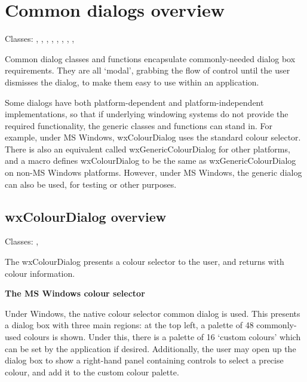 \section{Common dialogs overview}\label{commondialogsoverview}

Classes: , ,
\rtfsp{}, ,\rtfsp
{}, ,\rtfsp
{}, ,\rtfsp
{}

Common dialog classes and functions encapsulate commonly-needed dialog box requirements.
They are all `modal', grabbing the flow of control until the user dismisses the dialog,
to make them easy to use within an application.

Some dialogs have both platform-dependent and platform-independent implementations,
so that if underlying windowing systems do not provide the required functionality,
the generic classes and functions can stand in. For example, under MS Windows, wxColourDialog
uses the standard colour selector. There is also an equivalent called wxGenericColourDialog
for other platforms, and a macro defines wxColourDialog to be the same as wxGenericColourDialog
on non-MS Windows platforms. However, under MS Windows, the generic dialog can also be
used, for testing or other purposes.

\subsection{wxColourDialog overview}\label{wxcolourdialogoverview}

Classes: , 

The wxColourDialog presents a colour selector to the user, and returns
with colour information.

{\bf The MS Windows colour selector}

Under Windows, the native colour selector common dialog is used. This
presents a dialog box with three main regions: at the top left, a
palette of 48 commonly-used colours is shown. Under this, there is a
palette of 16 `custom colours' which can be set by the application if
desired. Additionally, the user may open up the dialog box to show
a right-hand panel containing controls to select a precise colour, and add
it to the custom colour palette.

